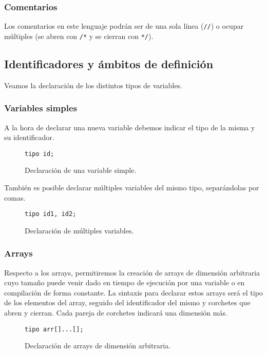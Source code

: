 \subsubsection{Comentarios}
Los comentarios en este lenguaje podrán ser de una sola línea (\lstinline{//}) o
ocupar múltiples (se abren con \lstinline{/*} y se cierran con \lstinline{*/}).

\subsection{Identificadores y ámbitos de definición}
Veamos la declaración de los distintos tipos de variables.
\subsubsection{Variables simples}
A la hora de declarar una nueva variable debemos indicar el tipo de la misma y
su identificador.
\begin{figure}[htbp]
    \centering
    \begin{lstlisting}
tipo id;
    \end{lstlisting}
    \caption{Declaración de una variable simple.}
\end{figure}
También es posible declarar múltiples variables del mismo tipo, separándolas por
comas.
\begin{figure}[htbp]
    \centering
    \begin{lstlisting}
tipo id1, id2;
    \end{lstlisting}
    \caption{Declaración de múltiples variables.}
\end{figure}


\subsubsection{Arrays}
Respecto a los arrays, permitiremos la creación de arrays de dimensión
arbitraria cuyo tamaño puede venir dado en tiempo de ejecución por una variable
o en compilación de forma constante. La sintaxis para declarar estos arrays será
el tipo de los elementos del array, seguido del identificador del mismo y
corchetes que abren y cierran. Cada pareja de corchetes indicará una dimensión
más.
\begin{figure}[htbp]
    \centering
    \begin{lstlisting}
tipo arr[]...[];
    \end{lstlisting}
    \caption{Declaración de arrays de dimensión arbitraria.}
\end{figure}

